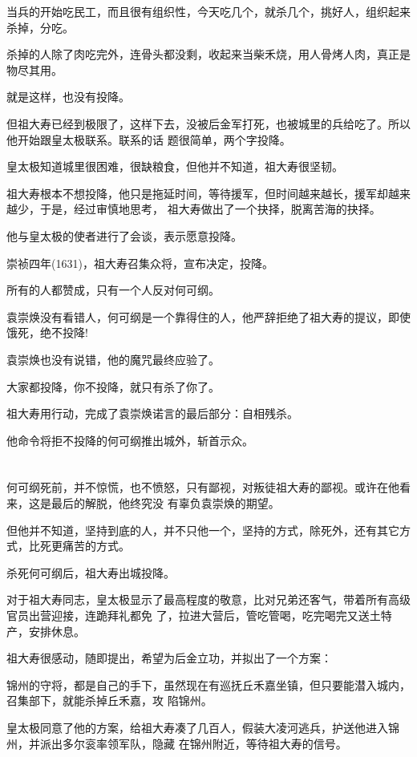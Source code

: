 \documentclass[11pt,a4paper,onecolumn]{article}
\begin{document}
当兵的开始吃民工，而且很有组织性，今天吃几个，就杀几个，挑好人，组织起来杀掉，分吃。

杀掉的人除了肉吃完外，连骨头都没剩，收起来当柴禾烧，用人骨烤人肉，真正是物尽其用。

就是这样，也没有投降。

但祖大寿已经到极限了，这样下去，没被后金军打死，也被城里的兵给吃了。所以他开始跟皇太极联系。联系的话
题很简单，两个字\myrule 投降。

皇太极知道城里很困难，很缺粮食，但他并不知道，祖大寿很坚韧。

祖大寿根本不想投降，他只是拖延时间，等待援军，但时间越来越长，援军却越来越少，于是，经过审慎地思考，
祖大寿做出了一个抉择，脱离苦海的抉择。

他与皇太极的使者进行了会谈，表示愿意投降。

崇祯四年(1631)，祖大寿召集众将，宣布决定，投降。

所有的人都赞成，只有一个人反对\myrule 何可纲。

袁崇焕没有看错人，何可纲是一个靠得住的人，他严辞拒绝了祖大寿的提议，即使饿死，绝不投降!

袁崇焕也没有说错，他的魔咒最终应验了。

大家都投降，你不投降，就只有杀了你了。

祖大寿用行动，完成了袁崇焕诺言的最后部分：自相残杀。

他命令将拒不投降的何可纲推出城外，斩首示众。

\section[\thesection]{}

何可纲死前，并不惊慌，也不愤怒，只有鄙视，对叛徒祖大寿的鄙视。或许在他看来，这是最后的解脱，他终究没
有辜负袁崇焕的期望。

但他并不知道，坚持到底的人，并不只他一个，坚持的方式，除死外，还有其它方式，比死更痛苦的方式。

杀死何可纲后，祖大寿出城投降。

对于祖大寿同志，皇太极显示了最高程度的敬意，比对兄弟还客气，带着所有高级官员出营迎接，连跪拜礼都免
了，拉进大营后，管吃管喝，吃完喝完又送土特产，安排休息。

祖大寿很感动，随即提出，希望为后金立功，并拟出了一个方案：

锦州的守将，都是自己的手下，虽然现在有巡抚丘禾嘉坐镇，但只要能潜入城内，召集部下，就能杀掉丘禾嘉，攻
陷锦州。

皇太极同意了他的方案，给祖大寿凑了几百人，假装大凌河逃兵，护送他进入锦州，并派出多尔衮率领军队，隐藏
在锦州附近，等待祖大寿的信号。
\end{document}
